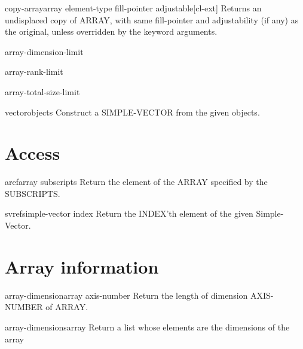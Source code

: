 \documentclass[10pt,english]{book}
\begin{document}
\begin{function}{copy-array}{array \key element-type fill-pointer adjustable}[cl-ext]
  Returns an undisplaced copy of ARRAY, with same fill-pointer
and adjustability (if any) as the original, unless overridden by
the keyword arguments.
\end{function}

\begin{constant}{array-dimension-limit}{}
  
\end{constant}

\begin{constant}{array-rank-limit}{}
  
\end{constant}

\begin{constant}{array-total-size-limit}{}
  
\end{constant}

\begin{function}{vector}{\rest objects}
  Construct a SIMPLE-VECTOR from the given objects.
\end{function}

\section{Access}
\label{sec:array-access}

\begin{accessor}{aref}{array \rest subscripts}
  Return the element of the ARRAY specified by the SUBSCRIPTS.
\end{accessor}

\begin{accessor}{svref}{simple-vector index}
  Return the INDEX'th element of the given Simple-Vector.
\end{accessor}

\section{Array information}
\label{sec:array-information}

\begin{function}{array-dimension}{array axis-number}
  Return the length of dimension AXIS-NUMBER of ARRAY.
\end{function}

\begin{function}{array-dimensions}{array}
  Return a list whose elements are the dimensions of the array
\end{function}
\end{document}
